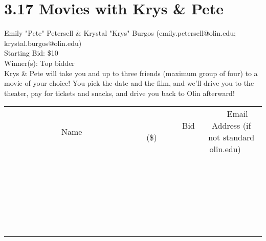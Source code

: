 \documentclass[11pt]{article}
\begin{document}
\section*{3.17 Movies with Krys \& Pete}
Emily "Pete" Petersell \& Krystal "Krys" Burgos (emily.petersell@olin.edu; krystal.burgos@olin.edu) \\
Starting Bid: \$10 \\
Winner(s): 
Top bidder \\
Krys \& Pete will take you and up to three friends (maximum group of four) to a movie of your choice! You pick the date and the film, and we'll drive you to the theater, pay for tickets and snacks, and drive you back to Olin afterward! \\[6ex]
\begin{tabular}{c c c}
~~~~~~~~~~~~~Name~~~~~~~~~~~~~ & ~~~~~~~~~Bid (\$)~~~~~~~~~ & ~~~Email Address (if not standard olin.edu)~~~ \\
 & & \\
\hline
 & & \\
\hline
 & & \\
\hline
 & & \\
\hline
 & & \\
\hline
 & & \\
\hline
 & & \\
\hline
 & & \\
\hline
 & & \\
\hline
 & & \\
\hline
 & & \\
\hline
 & & \\
\hline
 & & \\
\hline
 & & \\
\hline
 & & \\
\hline
 & & \\
\hline
 & & \\
\hline
 & & \\
\hline
 & & \\
\hline
 & & \\
\hline
 & & \\
\hline
 & & \\
\hline
 & & \\
\hline
 & & \\
\hline
 & & \\
\hline
 & & \\
\hline
\end{tabular}
\clearpage
\end{document}

